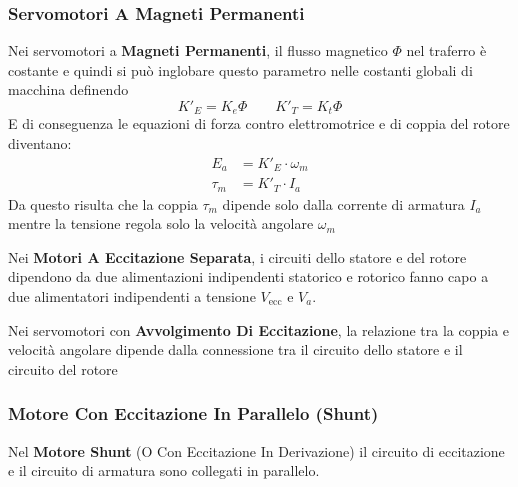 ﻿\documentclass[11pt, a4paper]{article}
\begin{document}
\subsubsection{Servomotori A Magneti Permanenti}
Nei servomotori a \textbf{Magneti Permanenti}, il flusso magnetico $\Phi$ nel traferro è costante e quindi si può inglobare questo parametro nelle costanti globali di macchina definendo
\[
    K'_{E} = K_e \Phi \qquad K'_{T} = K_t \Phi
\]
E di conseguenza le equazioni di forza contro elettromotrice e di coppia del rotore diventano:
\begin{align*}
    E_a     &= K'_{E} \cdot \omega_m\\
    \tau_m  &= K'_{T} \cdot I_a
\end{align*}
Da questo risulta che la coppia $\tau_m$ dipende solo dalla corrente di armatura $I_{a}$ mentre la tensione regola solo la velocità angolare $\omega_m$

Nei \textbf{Motori A Eccitazione Separata}, i circuiti dello statore e del rotore dipendono da due alimentazioni indipendenti statorico e rotorico fanno capo a due alimentatori indipendenti a tensione $V_{\text{ecc}}$ e $V_a$.

Nei servomotori con \textbf{Avvolgimento Di Eccitazione}, la relazione tra la coppia e velocità angolare dipende dalla connessione tra il circuito dello statore e il circuito del rotore

\subsubsection{Motore Con Eccitazione In Parallelo (Shunt)}
Nel \textbf{Motore Shunt} (O Con Eccitazione In Derivazione) il circuito di eccitazione e il circuito di armatura sono collegati in parallelo.
\end{document}
